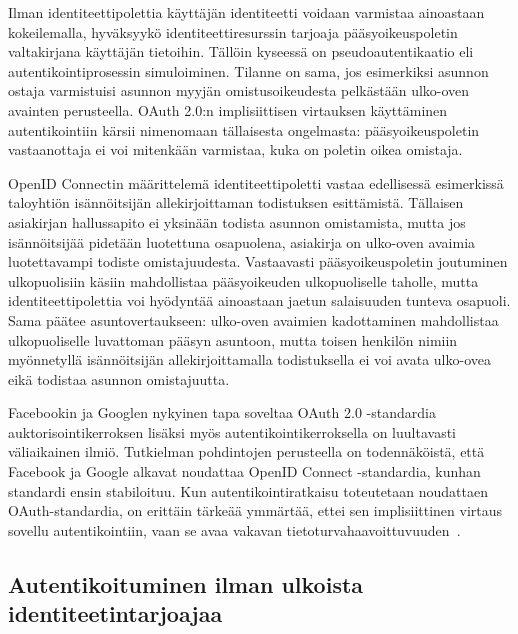 \documentclass[finnish,gradu]{tktltiki}
\begin{document}
  Ilman identiteettipolettia käyttäjän identiteetti voidaan varmistaa ainoastaan kokeilemalla, hyväksyykö identiteettiresurssin tarjoaja pääsyoikeuspoletin valtakirjana käyttäjän tietoihin. Tällöin kyseessä on pseudoautentikaatio eli autentikointiprosessin simuloiminen. Tilanne on sama, jos esimerkiksi asunnon ostaja varmistuisi asunnon myyjän omistusoikeudesta pelkästään ulko-oven avainten perusteella. OAuth 2.0:n implisiittisen virtauksen käyttäminen autentikointiin kärsii nimenomaan tällaisesta ongelmasta: pääsyoikeuspoletin vastaanottaja ei voi mitenkään varmistaa, kuka on poletin oikea omistaja.

  OpenID Connectin määrittelemä identiteettipoletti vastaa edellisessä esimerkissä taloyhtiön isännöitsijän allekirjoittaman todistuksen esittämistä. Tällaisen asiakirjan hallussapito ei yksinään todista asunnon omistamista, mutta jos isännöitsijää pidetään luotettuna osapuolena, asiakirja on ulko-oven avaimia luotettavampi todiste omistajuudesta. Vastaavasti pääsyoikeuspoletin joutuminen ulkopuolisiin käsiin mahdollistaa pääsyoikeuden ulkopuoliselle taholle, mutta identiteettipolettia voi hyödyntää ainoastaan jaetun salaisuuden tunteva osapuoli. Sama päätee asuntovertaukseen: ulko-oven avaimien kadottaminen mahdollistaa ulkopuoliselle luvattoman pääsyn asuntoon, mutta toisen henkilön nimiin myönnetyllä isännöitsijän allekirjoittamalla todistuksella ei voi avata ulko-ovea eikä todistaa asunnon omistajuutta.

  Facebookin ja Googlen nykyinen tapa soveltaa OAuth 2.0 -standardia auktorisointikerroksen lisäksi myös autentikointikerroksella on luultavasti väliaikainen ilmiö. Tutkielman pohdintojen perusteella on todennäköistä, että Facebook ja Google alkavat noudattaa OpenID Connect -standardia, kunhan standardi ensin stabiloituu. Kun autentikointiratkaisu toteutetaan noudattaen OAuth-standardia, on erittäin tärkeää ymmärtää, ettei sen implisiittinen virtaus sovellu autentikointiin, vaan se avaa vakavan tietoturvahaavoittuvuuden~\cite{bradley_implicit_followup_2012, bradley_oauth_implicit_flow_vulnerability_2012}.





  \subsection{Autentikoituminen ilman ulkoista identiteetintarjoajaa} %
  \label{sub:autentikoituminen_käyttäjäkeskeisellä_identiteetillä}
\end{document}
